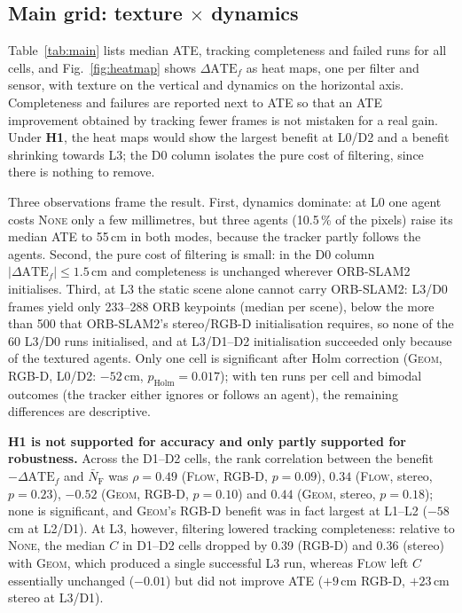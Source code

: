\documentclass[conference]{IEEEtran}
\newcommand{\none}{\textsc{None}}
\newcommand{\flow}{\textsc{Flow}}
\newcommand{\geom}{\textsc{Geom}}
\newcommand{\hyp}[1]{\textbf{H#1}}
\newcommand{\NFAST}{\bar{N}_{\mathrm{F}}}
\begin{document}
\subsection{Main grid: \texorpdfstring{texture $\times$ dynamics}{texture x dynamics}}
\label{sec:grid}
Table~\ref{tab:main} lists median ATE, tracking completeness and failed runs for all cells, and Fig.~\ref{fig:heatmap} shows $\Delta\mathrm{ATE}_f$ as heat maps, one per filter and sensor, with texture on the vertical and dynamics on the horizontal axis. Completeness and failures are reported next to ATE so that an ATE improvement obtained by tracking fewer frames is not mistaken for a real gain. Under \hyp{1}, the heat maps would show the largest benefit at L0/D2 and a benefit shrinking towards L3; the D0 column isolates the pure cost of filtering, since there is nothing to remove.

Three observations frame the result. First, dynamics dominate: at L0 one agent costs \none{} only a few millimetres, but three agents (10.5\,\% of the pixels) raise its median ATE to 55\,cm in both modes, because the tracker partly follows the agents. Second, the pure cost of filtering is small: in the D0 column $|\Delta\mathrm{ATE}_f|\le1.5$\,cm and completeness is unchanged wherever ORB-SLAM2 initialises. Third, at L3 the static scene alone cannot carry ORB-SLAM2: L3/D0 frames yield only 233--288 ORB keypoints (median per scene), below the more than 500 that ORB-SLAM2's stereo/RGB-D initialisation requires, so none of the 60 L3/D0 runs initialised, and at L3/D1--D2 initialisation succeeded only because of the textured agents. Only one cell is significant after Holm correction (\geom{}, RGB-D, L0/D2: $-52$\,cm, $p_{\mathrm{Holm}}=0.017$); with ten runs per cell and bimodal outcomes (the tracker either ignores or follows an agent), the remaining differences are descriptive.

\textbf{\hyp{1} is not supported for accuracy and only partly supported for robustness.} Across the D1--D2 cells, the rank correlation between the benefit $-\Delta\mathrm{ATE}_f$ and $\NFAST$ was $\rho=0.49$ (\flow{}, RGB-D, $p=0.09$), $0.34$ (\flow{}, stereo, $p=0.23$), $-0.52$ (\geom{}, RGB-D, $p=0.10$) and $0.44$ (\geom{}, stereo, $p=0.18$); none is significant, and \geom{}'s RGB-D benefit was in fact largest at L1--L2 ($-58$\,cm at L2/D1). At L3, however, filtering lowered tracking completeness: relative to \none{}, the median $C$ in D1--D2 cells dropped by 0.39 (RGB-D) and 0.36 (stereo) with \geom{}, which produced a single successful L3 run, whereas \flow{} left $C$ essentially unchanged ($-0.01$) but did not improve ATE ($+9$\,cm RGB-D, $+23$\,cm stereo at L3/D1).
\end{document}
